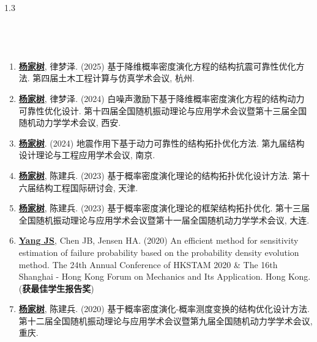 \documentclass{resume}
\begin{document}
\begin{spacing}{1.3}
\subsection{\faUsers\ }
\begin{enumerate}[itemsep=5pt,topsep=2pt]
  \item \underline{\textbf{杨家树}}, 律梦泽. (2025) 基于降维概率密度演化方程的结构抗震可靠性优化方法. 第四届土木工程计算与仿真学术会议, 杭州.
  \item \underline{\textbf{杨家树}}, 律梦泽. (2024) 白噪声激励下基于降维概率密度演化方程的结构动力可靠性优化设计. 第十四届全国随机振动理论与应用学术会议暨第十三届全国随机动力学学术会议, 西安.

  \item \underline{\textbf{杨家树}}. (2024) 地震作用下基于动力可靠性的结构拓扑优化方法. 第九届结构设计理论与工程应用学术会议, 南京.

  \item \underline{\textbf{杨家树}}, 陈建兵. (2023) 基于概率密度演化理论的结构拓扑优化设计方法. 第十六届结构工程国际研讨会, 天津.

  \item \underline{\textbf{杨家树}}, 陈建兵. (2023) 基于概率密度演化理论的框架结构拓扑优化. 第十三届全国随机振动理论与应用学术会议暨第十一届全国随机动力学学术会议, 大连.

  \item \underline{\textbf{Yang JS}}, Chen JB, Jensen HA. (2020) An efficient method for sensitivity estimation of failure probability based on the probability density evolution method. The 24th Annual Conference of HKSTAM 2020 \& The 16th Shanghai - Hong Kong Forum on Mechanics and Its Application. Hong Kong. (\textbf{获最佳学生报告奖})
  
  \item \underline{\textbf{杨家树}}, 陈建兵. (2020) 基于概率密度演化-概率测度变换的结构优化设计方法. 第十二届全国随机振动理论与应用学术会议暨第九届全国随机动力学学术会议, 重庆.
\end{enumerate}
\end{spacing}
\end{document}
